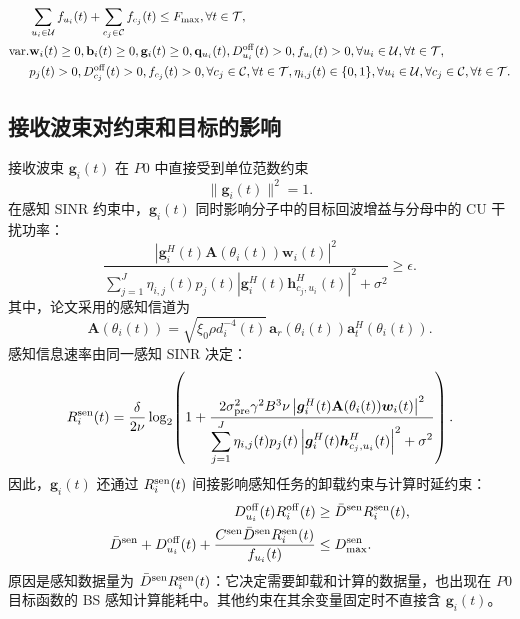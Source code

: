 \documentclass[11pt,a4paper]{ctexart}
\begin{document}
\begin{align}
    &
    \sum_{u_i\in\mathcal{U}}f_{u_i}(t)
    +\sum_{c_j\in\mathcal{C}}f_{c_j}(t)
    \leq F_{\max},
    \forall t\in\mathcal{T},
    \notag\\
    \text{var.}&
    \mathbf{w}_i(t)\geq0,
    \mathbf{b}_i(t)\geq0,
    \mathbf{g}_i(t)\geq0,
    \mathbf{q}_{u_i}(t),
    D_{u_i}^{\mathrm{off}}(t)>0,
    f_{u_i}(t)>0,
    \forall u_i\in\mathcal{U},
    \forall t\in\mathcal{T},
    \notag\\
    &
    p_j(t)>0,
    D_{c_j}^{\mathrm{off}}(t)>0,
    f_{c_j}(t)>0,
    \forall c_j\in\mathcal{C},
    \forall t\in\mathcal{T},
    \eta_{i,j}(t)\in\{0,1\},
    \forall u_i\in\mathcal{U},
    \forall c_j\in\mathcal{C},
    \forall t\in\mathcal{T}.
    \notag
\end{align}
\endgroup

\subsection{接收波束对约束和目标的影响}
接收波束 $\bm g_i(t)$ 在 $P0$ 中直接受到单位范数约束
\begin{equation}\label{eq:norm}
\|\bm g_i(t)\|^2=1.
\end{equation}
在感知 SINR 约束中，$\bm g_i(t)$ 同时影响分子中的目标回波增益与分母中的 CU 干扰功率：
\begin{equation}\label{eq:sinr}
\frac{\left|\bm g_i^H(t)\mathbf A(\theta_i(t))\bm w_i(t)\right|^2}
{\displaystyle\sum_{j=1}^{J}\eta_{i,j}(t)p_j(t)
\left|\bm g_i^H(t)\bm h_{c_j,u_i}^{H}(t)\right|^2+\sigma^2}\ge\epsilon.
\end{equation}
其中，论文采用的感知信道为
\begin{equation}\label{eq:A}
\mathbf A(\theta_i(t))=\sqrt{\xi_0\rho d_i^{-4}(t)}\,
\bm a_r(\theta_i(t))\bm a_t^H(\theta_i(t)).
\end{equation}
感知信息速率由同一感知 SINR 决定：
\begin{equation}\label{eq:rate}
R_i^{\rm sen}(t)=\frac{\delta}{2\nu}\log_2\!\left(
1+\frac{2\sigma_{\rm pre}^2\gamma^2B^3\nu
\left|\bm g_i^H(t)\mathbf A(\theta_i(t))\bm w_i(t)\right|^2}
{\displaystyle\sum_{j=1}^{J}\eta_{i,j}(t)p_j(t)
\left|\bm g_i^H(t)\bm h_{c_j,u_i}^{H}(t)\right|^2+\sigma^2}\right).
\end{equation}
因此，$\bm g_i(t)$ 还通过 $R_i^{\rm sen}(t)$ 间接影响感知任务的卸载约束与计算时延约束：
\begin{align}
D_{u_i}^{\rm off}(t)R_i^{\rm off}(t)&\ge\bar D^{\rm sen}R_i^{\rm sen}(t),\label{eq:impact-off}\\
\bar D^{\rm sen}+D_{u_i}^{\rm off}(t)+
\frac{C^{\rm sen}\bar D^{\rm sen}R_i^{\rm sen}(t)}{f_{u_i}(t)}
&\le D_{\max}^{\rm sen}.\label{eq:impact-delay}
\end{align}
原因是感知数据量为 $\bar D^{\rm sen}R_i^{\rm sen}(t)$：它决定需要卸载和计算的数据量，也出现在 $P0$ 目标函数的 BS 感知计算能耗中。其他约束在其余变量固定时不直接含 $\bm g_i(t)$。
\end{document}
